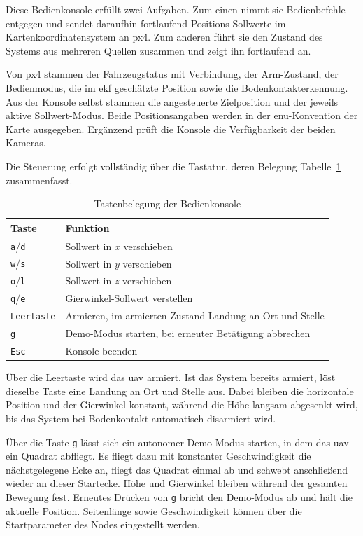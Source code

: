 Diese Bedienkonsole erfüllt zwei Aufgaben.
Zum einen nimmt sie Bedienbefehle entgegen und sendet daraufhin fortlaufend Positions-Sollwerte im Kartenkoordinatensystem an \gls{px4}.
Zum anderen führt sie den Zustand des Systems aus mehreren Quellen zusammen und zeigt ihn fortlaufend an.

Von \gls{px4} stammen der Fahrzeugstatus mit Verbindung, der Arm-Zustand, der Bedienmodus, die im \gls{ekf} geschätzte Position sowie die Bodenkontakterkennung.
Aus der Konsole selbst stammen die angesteuerte Zielposition und der jeweils aktive Sollwert-Modus.
Beide Positionsangaben werden in der \gls{enu}-Konvention der Karte ausgegeben.
Ergänzend prüft die Konsole die Verfügbarkeit der beiden Kameras.

Die Steuerung erfolgt vollständig über die Tastatur, deren Belegung Tabelle~\ref{tab:konsole_tasten} zusammenfasst.
\begin{table}[htbp]
\centering
\begin{tabular}{ll}
\toprule
\textbf{Taste} & \textbf{Funktion} \\
\midrule
\texttt{a}/\texttt{d}   & Sollwert in $x$ verschieben \\
\texttt{w}/\texttt{s}   & Sollwert in $y$ verschieben \\
\texttt{o}/\texttt{l}   & Sollwert in $z$ verschieben \\
\texttt{q}/\texttt{e}   & Gierwinkel-Sollwert verstellen \\
\texttt{Leertaste}      & Armieren, im armierten Zustand Landung an Ort und Stelle \\
\texttt{g}              & Demo-Modus starten, bei erneuter Betätigung abbrechen \\
\texttt{Esc}            & Konsole beenden \\
\bottomrule
\end{tabular}
\caption{Tastenbelegung der Bedienkonsole}
\label{tab:konsole_tasten}
\end{table}
\FloatBarrier

Über die Leertaste wird das \gls{uav} armiert.
Ist das System bereits armiert, löst dieselbe Taste eine Landung an Ort und Stelle aus. 
Dabei bleiben die horizontale Position und der Gierwinkel konstant, 
während die Höhe langsam abgesenkt wird, bis das System bei Bodenkontakt automatisch disarmiert wird.

Über die Taste \texttt{g} lässt sich ein autonomer Demo-Modus starten, in dem das \gls{uav} ein Quadrat abfliegt.
Es fliegt dazu mit konstanter Geschwindigkeit die nächstgelegene Ecke an, fliegt das Quadrat einmal ab und schwebt anschließend wieder an dieser Startecke.
Höhe und Gierwinkel bleiben während der gesamten Bewegung fest.
Erneutes Drücken von \texttt{g} bricht den Demo-Modus ab und hält die aktuelle Position.
Seitenlänge sowie Geschwindigkeit können über die Startparameter des Nodes eingestellt werden.

